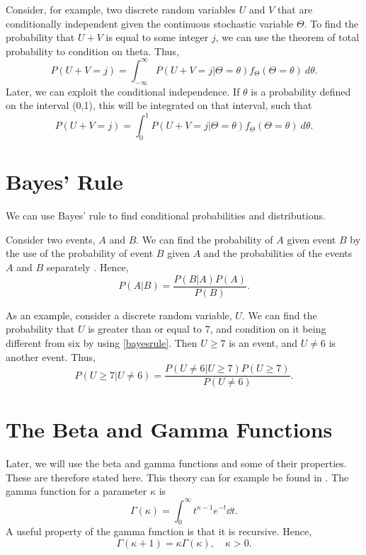 Consider, for example, two discrete random variables $U$ and $V$ that are conditionally independent given the continuous stochastic variable $\Theta$. To find the probability that $U+V$ is equal to some integer $j$, we can use the theorem of total probability to condition on theta. Thus,
\begin{equation*}
    P(U+V=j) = \int_{-\infty}^\infty P(U+V=j|\Theta=\theta)f_{\Theta}(\Theta=\theta) \: d\theta.
\end{equation*}
Later, we can exploit the conditional independence. If $\theta$ is a probability defined on the interval (0,1), this will be integrated on that interval, such that 
\begin{equation*}
    P(U+V=j) = \int_{0}^1 P(U+V=j|\Theta=\theta)f_{\Theta}(\Theta=\theta) \: d\theta.
\end{equation*}




\section{Bayes' Rule}
We can use Bayes' rule to find conditional probabilities and distributions. 
\begin{theorem}
Consider two events, $A$ and $B$. We can find the probability of $A$ given event $B$ by the use of the probability of event $B$ given $A$ and the probabilities of the events $A$ and $B$ separately \citep{statinf}. Hence,
\begin{equation}
\label{bayesrule}
    P(A|B)=\frac{P(B|A)P(A)}{P(B)}.
\end{equation}
\end{theorem}


As an example, consider a discrete random variable, $U$. We can find the probability that $U$ is greater than or equal to 7, and condition on it being different from six by using \eqref{bayesrule}. Then $U \geq 7$ is an event, and $U\neq6$ is another event. Thus,
\begin{equation}
    P(U\geq 7|U\neq6) = \frac{P(U\neq6|U\geq7)P(U\geq7)}{P(U\neq6)}.
\end{equation}



\section{The Beta and Gamma Functions}
Later, we will use the beta and gamma functions and some of their properties. These are therefore stated here. This theory can for example be found in \citet{statinf}. The gamma function for a parameter $\kappa$ is 
\begin{equation*}
    \label{gamma_func}
    \Gamma(\kappa) = \int_0^\infty t^{\kappa-1}e^{-t} \dd t.
\end{equation*}
A useful property of the gamma function is that it is recursive. Hence,
\begin{equation}
\label{gamma_recursive_property}
    \Gamma(\kappa+1) = \kappa \Gamma(\kappa), \quad \kappa>0 .
\end{equation}

